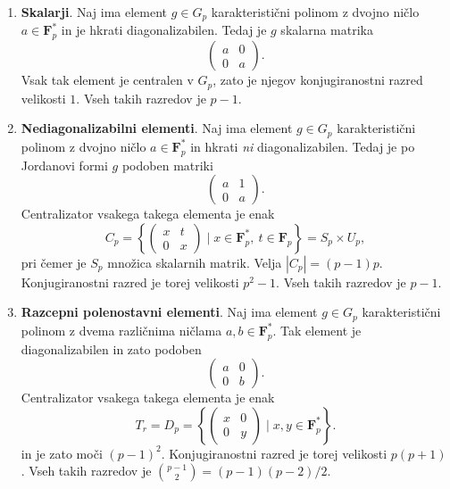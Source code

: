 \documentclass[11pt]{book}
\def\FF{\mathbf{F}}
\def\definicija{\color{rdeca}\bf}
\theoremstyle{definition}
\theoremstyle{zgled}
\theoremstyle{zgledbrezstevilke}
\theoremstyle{odprtproblem}
\theoremstyle{domacanaloga}
\theoremstyle{izrek}
\begin{document}
\begin{enumerate}
    \item {\definicija Skalarji}. Naj ima element $g \in G_p$ karakteristični polinom z dvojno ničlo $a \in \FF_p^*$ in je hkrati diagonalizabilen. Tedaj je $g$ skalarna matrika
    \[
        \begin{pmatrix}
            a & 0 \\ 0 & a
        \end{pmatrix}.
    \]
    Vsak tak element je centralen v $G_p$, zato je njegov konjugiranostni razred velikosti $1$. Vseh takih razredov je $p-1$.

    \item {\definicija Nediagonalizabilni elementi}. Naj ima element $g \in G_p$ karakteristični polinom z dvojno ničlo $a \in \FF_p^*$ in hkrati \emph{ni} diagonalizabilen. Tedaj je po Jordanovi formi $g$ podoben matriki
    \[
        \begin{pmatrix}
            a & 1 \\ 0 & a
        \end{pmatrix}. 
    \]
    Centralizator vsakega takega elementa je enak
    \[
      C_p = \left\{ \begin{pmatrix}
      x & t \\ 0 & x
  \end{pmatrix} \mid x \in \FF_p^*, \ t \in \FF_p \right\} = S_p \times U_p,
    \]
    pri čemer je $S_p$ množica skalarnih matrik. Velja $|C_p| = (p-1)p$. Konjugiranostni razred je torej velikosti $p^2 - 1$. Vseh takih razredov je $p-1$.

    \item {\definicija Razcepni polenostavni elementi}. Naj ima element $g \in G_p$ karakteristični polinom z dvema različnima ničlama $a,b \in \FF_p^*$. Tak element je diagonalizabilen in zato podoben
    \[
        \begin{pmatrix}
            a & 0 \\ 0 & b
        \end{pmatrix}.
    \]
    Centralizator vsakega takega elementa je enak
    \[
        T_r = D_p = \left\{ \begin{pmatrix}
            x & 0 \\ 0 & y
        \end{pmatrix} \mid x, y \in \FF_p^* \right\}.
    \]
    in je zato moči $(p-1)^2$. Konjugiranostni razred je torej velikosti $p(p+1)$. Vseh takih razredov je $\binom{p-1}{2} = (p-1)(p-2)/2$.


\end{enumerate}
\end{document}
